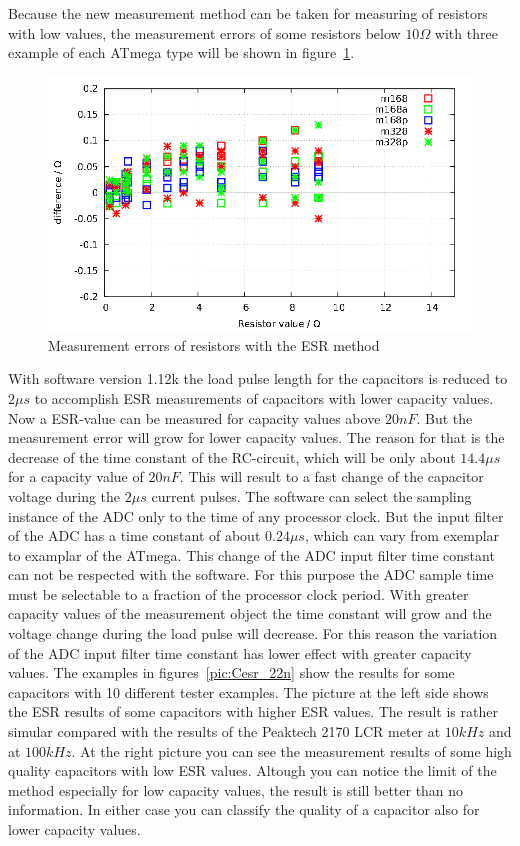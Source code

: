 Because the new measurement method can be taken for measuring of resistors with low values, the
measurement errors of some resistors below \(10\Omega\) with three example of each ATmega type will be shown in
figure~\ref{fig:res_esr}. 

\begin{figure}[H]
\centering
\includegraphics[width=18cm]{../GNU/res_esr.pdf}
\caption{Measurement errors of resistors with the ESR method}
\label{fig:res_esr}
\end{figure}

With software version 1.12k the load pulse length for the capacitors is reduced to \(2\mu s\) to accomplish ESR measurements
of capacitors with lower capacity values. Now a ESR-value can be measured for capacity values above \(20nF\).
But the measurement error will grow for lower capacity values. The reason for that is the decrease of the time constant of the
RC-circuit, which will be only about \(14.4\mu s\) for a capacity value of \(20nF\).
This will result to a fast change of the capacitor voltage during the \(2\mu s\) current pulses.
The software can select the sampling instance of the ADC only to the time of any processor clock.
But the input filter of the ADC has a time constant of about \(0.24\mu s\), which can vary from exemplar to examplar of the ATmega.
This change of the ADC input filter time constant can not be respected with the software.
For this purpose the ADC sample time must be selectable to a fraction of the processor clock period.
With greater capacity values of the measurement object the time constant will grow and the voltage change during the
load pulse will decrease. For this reason the variation of the ADC input filter time constant  has
lower effect with greater capacity values.
The examples in figures~\ref{pic:Cesr_22n} show the results for some capacitors with 10 different tester examples. The picture at the left side
shows the ESR results of some capacitors with higher ESR values. The result is rather simular compared with the results
of the Peaktech 2170 LCR meter at \(10kHz\) and at \(100kHz\).
At the right picture you can see the measurement results of some high quality capacitors with low ESR values.
Altough you can notice the limit of the method especially for low capacity values, the result is still better than no information.
In either case you can classify the quality of a capacitor also for lower capacity values.

